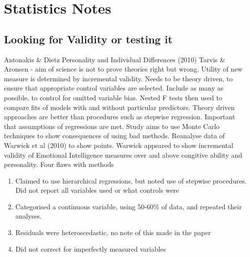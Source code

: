
\section{Statistics Notes}

\subsection{Looking for Validity or testing it}
Antonakis \& Dietz
Personality and Individual Differences (2010)
Tarvis \& Aronsen - aim of science is not to prove theories right but wrong.
Utility of new measure is determined by incremental validity.
Needs to be theory driven, to ensure that appropriate control variables are selected.
Include as many as possible, to control for omitted variable bias.
Nested F tests then used to compare fits of models with and without particular predictors.
Theory driven approaches are better than procedures such as stepwise regression.
Important that assumptions of regressions are met.
Study aims to use Monte Carlo techniques to show consequences of using bad methods.
Reanalyse data of Warwick et al (2010) to show points.
Warwick appeared to show incremental validity of Emotional Intelligence measures
over and above congitive ability and personality.
Four flaws with methods
\begin{enumerate}

\item Claimed to use hierarchical regressions, but noted use of stepwise procedures. Did not report all variables used or what controls were
\item Categorised a continuous variable, using 50-60\% of data, and repeated their analyses.
\item Residuals were heteroscedastic, no note of this made in the paper
\item Did not correct for imperfectly measured variables

\end{enumerate}

